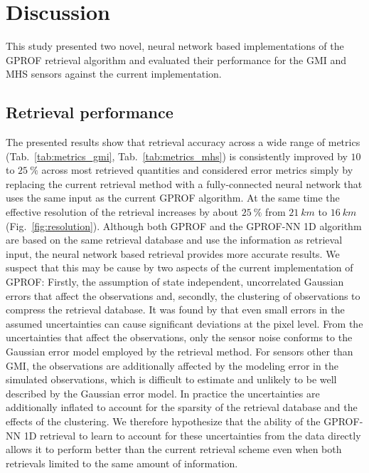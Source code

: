 \documentclass[a4paper,11pt,bibtotoc]{scrartcl}
\begin{document}
\section{Discussion}

This study presented two novel, neural network based implementations of the
GPROF retrieval algorithm and evaluated their performance for the GMI and MHS
sensors against the current implementation.

\subsection{Retrieval performance}

The presented results show that retrieval accuracy across a wide range of
metrics (Tab.~\ref{tab:metrics_gmi}, Tab.~\ref{tab:metrics_mhs}) is consistently
improved by  $10$ to $25\ \unit{\%}$ across most retrieved quantities and
considered error metrics simply by replacing the current retrieval method with a
fully-connected neural network that uses the same input as the current GPROF
algorithm. At the same time the effective resolution of the retrieval increases
by about $25\ \unit{\%}$ from $21\ \unit{km}$ to $16\ \unit{km}$
(Fig.~\ref{fig:resolution}). Although both GPROF and the GPROF-NN 1D algorithm
are based on the same retrieval database and use the information as retrieval
input, the neural network based retrieval provides more accurate results. We
suspect that this may be cause by two aspects of the current implementation of
GPROF: Firstly, the assumption of state independent, uncorrelated Gaussian
errors that affect the observations and, secondly, the clustering of
observations to compress the retrieval database. It was found by
\citet{elsaesser15} that even small errors in the assumed uncertainties can
cause significant deviations at the pixel level. From the uncertainties that
affect the observations, only the sensor noise conforms to the Gaussian error
model employed by the retrieval method. For sensors other than GMI, the
observations are additionally affected by the modeling error in the simulated
observations, which is difficult to estimate and unlikely to be well described
by the Gaussian error model. In practice the uncertainties are additionally
inflated to account for the sparsity of the retrieval database and the effects
of the clustering. We therefore hypothesize that the ability of the GPROF-NN 1D
retrieval to learn to account for these uncertainties from the data directly
allows it to perform better than the current retrieval scheme even when both
retrievals limited to the same amount of information.
\end{document}
